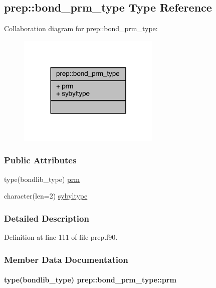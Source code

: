 \hypertarget{structprep_1_1bond__prm__type}{\subsection{prep\-:\-:bond\-\_\-prm\-\_\-type Type Reference}
\label{structprep_1_1bond__prm__type}
}


Collaboration diagram for prep\-:\-:bond\-\_\-prm\-\_\-type\-:
\nopagebreak
\begin{figure}[H]
\begin{center}
\leavevmode
\includegraphics[width=192pt]{structprep_1_1bond__prm__type__coll__graph}
\end{center}
\end{figure}
\subsubsection*{Public Attributes}
\begin{DoxyCompactItemize}
\item 
type(bondlib\-\_\-type) \hyperlink{structprep_1_1bond__prm__type_a24080fda9602e405c615527ba7ac0e9a}{prm}
\item 
character(len=2) \hyperlink{structprep_1_1bond__prm__type_a9fceecf0d44443bdb2ed43fd6214e2e1}{sybyltype}
\end{DoxyCompactItemize}


\subsubsection{Detailed Description}


Definition at line 111 of file prep.\-f90.



\subsubsection{Member Data Documentation}
\hypertarget{structprep_1_1bond__prm__type_a24080fda9602e405c615527ba7ac0e9a}{
\paragraph[{prm}]{\setlength{\rightskip}{0pt plus 5cm}type(bondlib\-\_\-type) prep\-::bond\-\_\-prm\-\_\-type\-::prm}}\label{structprep_1_1bond__prm__type_a24080fda9602e405c615527ba7ac0e9a}


